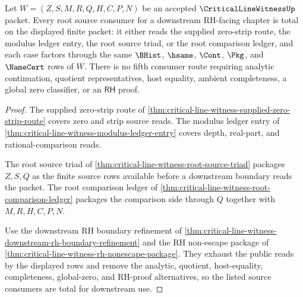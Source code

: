 \begin{theorem}
\label{thm:critical-line-witness-root-source-consumer-totality}
Let $W=(Z,S,M,R,Q,H,C,P,N)$ be an accepted $\CriticalLineWitnessUp$ packet. Every root source consumer for a downstream RH-facing chapter is total on the displayed finite packet: it either reads the supplied zero-strip route, the modulus ledger entry, the root source triad, or the root comparison ledger, and each case factors through the same $\BHist$, $\hsame$, $\Cont$, $\Pkg$, and $\NameCert$ rows of $W$. There is no fifth consumer route requiring analytic continuation, quotient representatives, host equality, ambient completeness, a global zero classifier, or an $\mathsf{RH}$ proof.
\end{theorem}
\begin{proof}
The supplied zero-strip route of \autoref{thm:critical-line-witness-supplied-zero-strip-route} covers zero and strip source reads. The modulus ledger entry of \autoref{thm:critical-line-witness-modulus-ledger-entry} covers depth, real-part, and rational-comparison reads.

The root source triad of \autoref{thm:critical-line-witness-root-source-triad} packages $Z,S,Q$ as the finite source rows available before a downstream boundary reads the packet. The root comparison ledger of \autoref{thm:critical-line-witness-root-comparison-ledger} packages the comparison side through $Q$ together with $M,R,H,C,P,N$.

Use the downstream RH boundary refinement of \autoref{thm:critical-line-witness-downstream-rh-boundary-refinement} and the RH non-escape package of \autoref{thm:critical-line-witness-rh-nonescape-package}. They exhaust the public reads by the displayed rows and remove the analytic, quotient, host-equality, completeness, global-zero, and RH-proof alternatives, so the listed source consumers are total for downstream use.
\end{proof}
